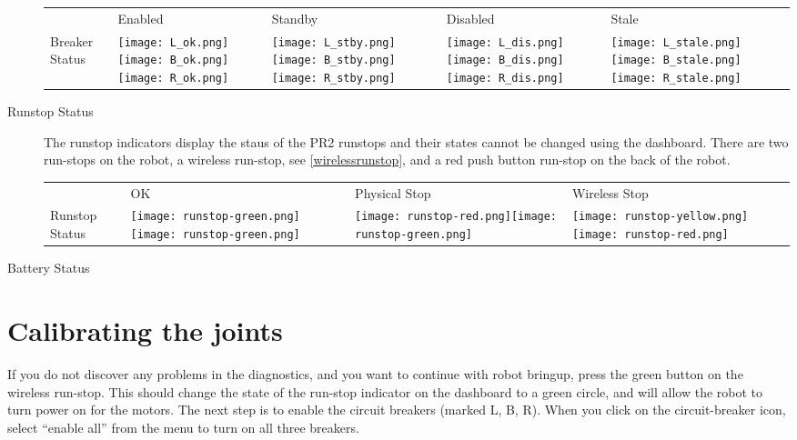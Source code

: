 \begin{description}
    \begin{tabular}{m{2.6cm}SSSS}
     & Enabled & Standby & Disabled & Stale\\
    Breaker Status & \texttt{[image: L\_ok.png]}\texttt{[image: B\_ok.png]}\texttt{[image: R\_ok.png]}&
                     \texttt{[image: L\_stby.png]}\texttt{[image: B\_stby.png]}\texttt{[image: R\_stby.png]}&
                     \texttt{[image: L\_dis.png]}\texttt{[image: B\_dis.png]}\texttt{[image: R\_dis.png]}&
                     \texttt{[image: L\_stale.png]}\texttt{[image: B\_stale.png]}\texttt{[image: R\_stale.png]}\\
   \end{tabular}



\item[Runstop Status] The runstop indicators display the staus of the PR2 runstops and their states cannot be changed using the dashboard. 
There are two run-stops on the robot, a wireless run-stop, see \ref{wirelessrunstop}, and a red push button run-stop on the back of the robot.\\

    \begin{tabular}{m{2.6cm}SSS}
     & OK & Physical Stop & Wireless Stop\\
    Runstop Status & \texttt{[image: runstop-green.png]}\texttt{[image: runstop-green.png]}&
                     \texttt{[image: runstop-red.png]}\texttt{[image: runstop-green.png]}&
                     \texttt{[image: runstop-yellow.png]}\texttt{[image: runstop-red.png]}\\
   \end{tabular}


\item[Battery Status]
\end{description}

\section{Calibrating the joints}
If you do not discover any problems in the diagnostics, and you want to continue with robot bringup, press the green button on the wireless run-stop.  This should change the state of the run-stop indicator on the dashboard to a green circle, and will allow the robot to turn power on for the motors.  The next step is to enable the circuit breakers (marked L, B, R).  When you click on the circuit-breaker icon, select ``enable all'' from the menu to turn on all three breakers.

